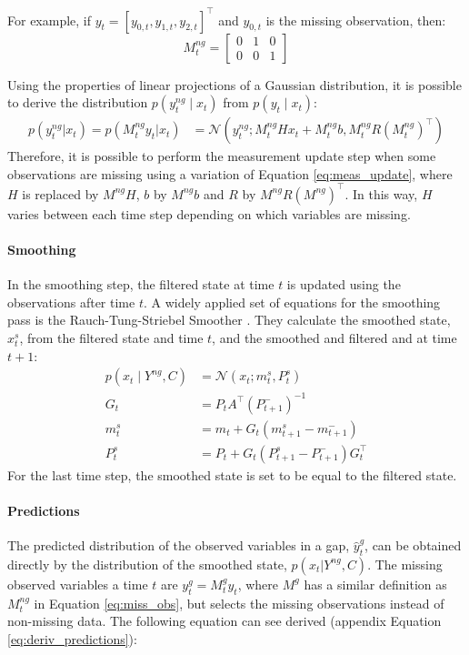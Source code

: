 \documentclass{article}
\newcommand{\norm}[3]{\mathcal{N}\left(#1; #2, #3\right)} %
\begin{document}
For example, if $y_t = [y_{0,t}, y_{1,t}, y_{2,t}]^\top$ and $y_{0,t}$ is the missing observation, then:
\begin{equation*}
 M^{ng}_t = \left[\begin{array}{ccc}
    0 & 1 & 0 \\
    0 & 0 & 1
\end{array}\right]
\end{equation*}

Using the properties of linear projections of a Gaussian distribution, it is possible to derive the distribution $p(y^{ng}_t \mid x_t)$ from $p(y_t \mid x_t)$: 
 \begin{align*}
   p(y^{ng}_t|x_t) = p(M^{ng}_ty_t|x_t) &=   \norm{y^{ng}_t}{M^{ng}_tHx_t + M^{ng}_tb}{M^{ng}_tR(M^{ng}_t)^\top}%
\end{align*}
Therefore, it is possible to perform the measurement update step when some observations are missing using a variation of Equation \ref{eq:meas_update}, where $H$ is replaced by $M^{ng}H$, $b$ by $M^{ng}b$ and $R$ by $M^{ng}R(M^{ng})^\top$. In this way, $H$ varies between each time step depending on which variables are missing.

\paragraph{Smoothing}

In the smoothing step, the filtered state at time $t$ is updated using the observations after time $t$. A widely applied set of equations for the smoothing pass is the Rauch-Tung-Striebel Smoother \cite{rauch_maximum_1965}. They calculate the smoothed state, $x_t^s$, from the filtered state and time $t$, and the smoothed and filtered and at time $t+1$:
\begin{equation}
\begin{aligned}\label{eq:smoother}
    p(x_t \mid Y^{ng}, C) &= \norm{x_t}{m_t^s}{P_t^s} \\
    G_t &= P_tA^\top(P_{t+1}^-)^{-1}\\
    m_t^s &= m_t + G_t(m_{t+1}^s - m_{t+1}^-) \\
    P_t^s &= P_t + G_t(P_{t+1}^s - P_{t+1}^-)G_t^\top 
\end{aligned}
\end{equation}
For the last time step, the smoothed state is set to be equal to the filtered state.

\paragraph{Predictions} The predicted distribution of the observed variables in a gap, $\hat{y}^g_t$, can be obtained directly by the distribution of the smoothed state, $p(x_t | Y^{ng}, C)$.
The missing observed variables a time $t$ are $y^g_t = M^g_ty_t$, where $M^{g}$ has a similar definition as $M^{ng}_t$ in Equation \ref{eq:miss_obs}, but selects the missing observations instead of non-missing data.
The following equation can see derived (appendix Equation \ref{eq:deriv_predictions}):
\end{document}
